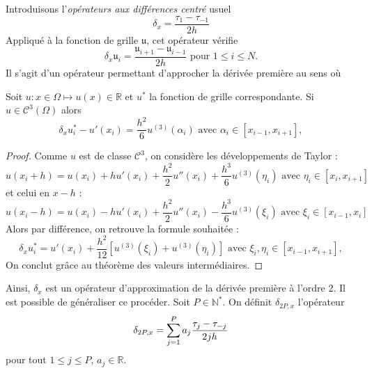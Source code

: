 Introduisons l'\textit{opérateurs aux différences centré} usuel
\begin{equation}
\delta_x = \dfrac{\tau_1 - \tau_{-1}}{2h}
\end{equation}
Appliqué à la fonction de grille $\mathfrak{u}$, cet opérateur vérifie 
\begin{equation}
\delta_x \mathfrak{u}_i = \dfrac{\mathfrak{u}_{i+1} - \mathfrak{u}_{i-1}}{2h} \text{ pour } 1 \leq i \leq N.
\end{equation}
Il s'agit d'un opérateur permettant d'approcher la dérivée première au sens où

\begin{proposition}
Soit $u: x \in \Omega \mapsto u(x) \in \mathbb{R}$ et $u^*$ la fonction de grille correspondante. Si $u \in \mathcal{C}^3 (\Omega)$ alors 
\begin{equation}
\delta_x u^*_i - u'(x_i) = \dfrac{h^2}{6} u^{(3)}(\alpha_i) \text{ avec } \alpha_i \in [x_{i-1}, x_{i+1}],
\end{equation}
\end{proposition}

\begin{proof}
Comme $u$ est de classe $\mathcal{C}^3$, on considère les développements de Taylor :
\begin{equation}
u(x_i+h) = u(x_i) + h u'(x_i) + \dfrac{h^2}{2} u''(x_i) + \dfrac{h^3}{6} u^{(3)} (\eta_i) \text{ avec } \eta_i \in [x_i, x_{i+1}]
\end{equation}
et celui en $x-h$ :
\begin{equation}
u(x_i-h) = u(x_i) - h u'(x_i) + \dfrac{h^2}{2} u''(x_i) - \dfrac{h^3}{6}u^{(3)}(\xi_i) \text{ avec } \xi_i \in [x_{i-1}, x_{i}]
\end{equation}
Alors par différence, on retrouve la formule souhaitée : 
\begin{equation}
\delta_x u^*_i = u'(x_i) + \dfrac{h^2}{12} \left[ u^{(3)}(\xi_i) + u^{(3)}(\eta_i) \right]  \text{ avec } \xi_i, \eta_i \in [x_{i-1}, x_{i+1}],
\end{equation}
On conclut grâce au théorème des valeurs intermédiaires.
\end{proof}

Ainsi, $\delta_x$ est un opérateur d'approximation de la dérivée première à l'ordre 2. Il est possible de généraliser ce procéder.
Soit $P \in \mathbb{N}^*$. 
On définit $\delta_{2P,x}$ l'opérateur
\begin{equation}
\delta_{2P,x} = \displaystyle\sum\limits_{j=1}^P a_j \dfrac{\tau_j - \tau_{-j}}{2 j h}
\label{eq:explicite_dx}
\end{equation}
pour tout $1 \leq j \leq P$, $a_j \in \mathbb{R}$. 




